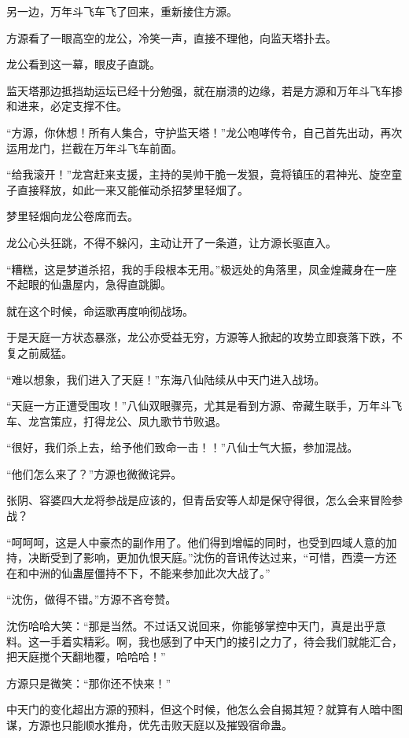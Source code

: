\begin{this_body}
另一边，万年斗飞车飞了回来，重新接住方源。

方源看了一眼高空的龙公，冷笑一声，直接不理他，向监天塔扑去。

龙公看到这一幕，眼皮子直跳。

监天塔那边抵挡劫运坛已经十分勉强，就在崩溃的边缘，若是方源和万年斗飞车掺和进来，必定支撑不住。

“方源，你休想！所有人集合，守护监天塔！”龙公咆哮传令，自己首先出动，再次运用龙门，拦截在万年斗飞车前面。

“给我滚开！”龙宫赶来支援，主持的吴帅干脆一发狠，竟将镇压的君神光、旋空童子直接释放，如此一来又能催动杀招梦里轻烟了。

梦里轻烟向龙公卷席而去。

龙公心头狂跳，不得不躲闪，主动让开了一条道，让方源长驱直入。

“糟糕，这是梦道杀招，我的手段根本无用。”极远处的角落里，凤金煌藏身在一座不起眼的仙蛊屋内，急得直跳脚。

就在这个时候，命运歌再度响彻战场。

于是天庭一方状态暴涨，龙公亦受益无穷，方源等人掀起的攻势立即衰落下跌，不复之前威猛。

“难以想象，我们进入了天庭！”东海八仙陆续从中天门进入战场。

“天庭一方正遭受围攻！”八仙双眼骤亮，尤其是看到方源、帝藏生联手，万年斗飞车、龙宫策应，打得龙公、凤九歌节节败退。

“很好，我们杀上去，给予他们致命一击！！”八仙士气大振，参加混战。

“他们怎么来了？”方源也微微诧异。

张阴、容婆四大龙将参战是应该的，但青岳安等人却是保守得很，怎么会来冒险参战？

“呵呵呵，这是人中豪杰的副作用了。他们得到增幅的同时，也受到四域人意的加持，决断受到了影响，更加仇恨天庭。”沈伤的音讯传达过来，“可惜，西漠一方还在和中洲的仙蛊屋僵持不下，不能来参加此次大战了。”

“沈伤，做得不错。”方源不吝夸赞。

沈伤哈哈大笑：“那是当然。不过话又说回来，你能够掌控中天门，真是出乎意料。这一手着实精彩。啊，我也感到了中天门的接引之力了，待会我们就能汇合，把天庭搅个天翻地覆，哈哈哈！”

方源只是微笑：“那你还不快来！”

中天门的变化超出方源的预料，但这个时候，他怎么会自揭其短？就算有人暗中图谋，方源也只能顺水推舟，优先击败天庭以及摧毁宿命蛊。


\end{this_body}
